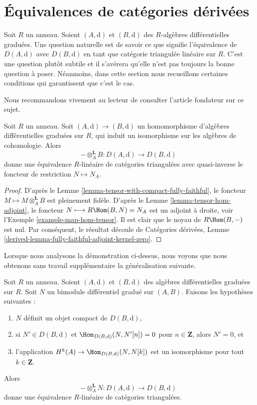\section{Équivalences de catégories dérivées}
\label{section-equivalence}

\noindent
Soit $R$ un anneau. Soient $(A, \text{d})$ et $(B, \text{d})$ des $R$-algèbres
différentielles graduées. Une question naturelle est de savoir ce que signifie
l'équivalence de $D(A, \text{d})$ avec $D(B, \text{d})$ en tant que catégorie
triangulée linéaire sur $R$. C'est une question plutôt subtile et il s'avérera
qu'elle n'est pas toujours la bonne question à poser. Néanmoins, dans cette
section nous recueillons certaines conditions qui garantissent que c'est le cas.

\medskip\noindent
Nous recommandons vivement au lecteur de consulter l'article fondateur
\cite{Rickard} sur ce sujet.

\begin{lemma}
\label{lemma-qis-equivalence}
Soit $R$ un anneau. Soit $(A, \text{d}) \to (B, \text{d})$ un homomorphisme
d’algèbres différentielles graduées sur $R$, qui induit un isomorphisme sur les
algèbres de cohomologie. Alors
$$
- \otimes_A^\mathbf{L} B : D(A, \text{d}) \to D(B, \text{d})
$$
donne une équivalence $R$-linéaire de catégories triangulées avec quasi-inverse
le foncteur de restriction $N \mapsto N_A$.
\end{lemma}

\begin{proof}
D'après le Lemme \ref{lemma-tensor-with-compact-fully-faithful}, le foncteur $M
\longmapsto M \otimes_A^\mathbf{L} B$ est pleinement fidèle. D'après le Lemme
\ref{lemma-tensor-hom-adjoint}, le foncteur $N \longmapsto R\Hom(B, N) = N_A$ est
un adjoint à droite, voir l'Exemple \ref{example-map-hom-tensor}. Il est clair que
le noyau de $R\Hom(B, -)$ est nul. Par conséquent, le résultat découle de Catégories dérivées,
Lemme
\ref{derived-lemma-fully-faithful-adjoint-kernel-zero}.
\end{proof}

\noindent
Lorsque nous analysons la démonstration ci-dessus, nous voyons que nous obtenons
sans travail supplémentaire la généralisation suivante.

\begin{lemma}
\label{lemma-tilting-equivalence}
Soit $R$ un anneau. Soient $(A, \text{d})$ et $(B, \text{d})$ des algèbres
différentielles graduées sur $R$. Soit $N$ un bimodule différentiel gradué sur
$(A, B)$. Faisons les hypothèses suivantes :
\begin{enumerate}
\item $N$ définit un objet compact de $D(B, \text{d})$,
\item si $N' \in D(B, \text{d})$ et $\Hom_{D(B, \text{d})}(N, N'[n]) = 0$ pour $n
\in \mathbf{Z}$, alors $N' = 0$, et
\item l'application $H^k(A) \to \Hom_{D(B, \text{d})}(N, N[k])$ est un
isomorphisme pour tout $k \in \mathbf{Z}$.
\end{enumerate}
Alors
$$
- \otimes_A^\mathbf{L} N : D(A, \text{d}) \to D(B, \text{d})
$$
donne une équivalence $R$-linéaire de catégories triangulées.
\end{lemma}

